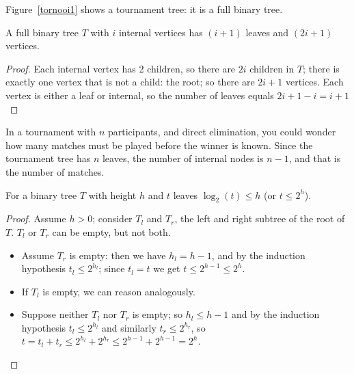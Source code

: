 Figure~\ref{tornooi1} shows a tournament tree: it is a full binary tree.

 \begin{theorem}
\label{relatiebladinwendig}
A full binary tree $T$ with $i$ internal vertices has
$(i+1)$ leaves and $(2i+1)$ vertices.
\end{theorem}
\begin{proof} Each internal vertex has 2 children, so there are $2i$
children in $T$; there is exactly one vertex that is not a child: the
root; so there are $2i+1$ vertices. Each vertex is either a leaf or
internal, so the number of leaves equals $2i+1 - i = i+1$
\end{proof}


In a tournament with $n$ participants, and direct elimination, you
could wonder how many matches must be played before the winner is
known. Since the tournament tree has $n$ leaves, the number of
internal nodes is $n-1$, and that is the number of matches.

 \begin{theorem}
\label{relatieheightbladeren}
For a binary tree $T$ with height $h$ and $t$ leaves $\log_2(t) \leq
h$ (or $t \leq 2^h$).
\end{theorem}
\begin{proof}
{
Assume $h > 0$; consider $T_{l}$ and $T_{r}$, the left and right
subtree of the root of $T$. $T_{l}$ or $T_{r}$ can be empty, but not both.
\begin{itemize}
\item
Assume $T_{r}$ is empty: then we have $h_{l} = h-1$, and by the induction hypothesis
$t_{l} \leq 2^{h_{l}}$; since $t_{l} = t$ we get $t \leq 2^{h-1}\leq
2^h$.
\item
If $T_{l}$ is empty, we can reason analogously.
\item
Suppose neither $T_{l}$ nor $T_{r}$ is empty; so $h_{l} \leq h-1$ and
by the induction hypothesis $t_{l} \leq 2^{h_{l}}$ and similarly $t_{r} \leq
2^{h_{r}}$, so $t=t_{l} + t_{r} \leq 2^{h_{l}} + 2^{h_{r}}\leq
2^{h-1}+2^{h-1}=2^h$.
\end{itemize}
}
\end{proof}

